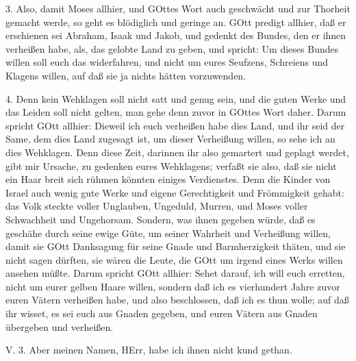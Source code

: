 3. Also, damit Moses allhier, und GOttes Wort auch geschwächt und zur Thorheit gemacht werde, so geht es blödiglich und geringe an. GOtt predigt allhier, daß er erschienen sei Abraham, Isaak und Jakob, und gedenkt des Bundes, den er ihnen verheißen habe, als, das gelobte Land zu geben, und spricht: Um dieses Bundes willen soll euch das widerfahren, und nicht um eures Seufzens, Schreiens und Klagens willen, auf daß sie ja nichts hätten vorzuwenden.

4. Denn kein Wehklagen soll nicht satt und genug sein, und die guten Werke und das Leiden soll nicht gelten, man gehe denn zuvor in GOttes Wort daher. Darum spricht GOtt allhier: Dieweil ich euch verheißen habe dies Land, und ihr seid der Same, dem dies Land zugesagt ist, um dieser Verheißung willen, so sehe ich an dies Wehklagen. Denn diese Zeit, darinnen ihr also gemartert und geplagt werdet, gibt mir Ursache, zu gedenken eures Wehklagens; verfaßt sie also, daß sie nicht ein Haar breit sich rühmen könnten einiges Verdienstes. Denn die Kinder von Israel auch wenig gute Werke und eigene Gerechtigkeit und Frömmigkeit gehabt: das Volk steckte voller Unglauben, Ungeduld, Murren, und Moses voller Schwachheit und Ungehorsam. Sondern, was ihnen gegeben würde, daß es geschähe durch seine ewige Güte, um seiner Wahrheit und Verheißung willen, damit sie GOtt Danksagung für seine Gnade und Barmherzigkeit thäten, und sie nicht sagen dürften, sie wären die Leute, die GOtt um irgend eines Werks willen ansehen müßte. Darum spricht GOtt allhier: Sehet darauf, ich will euch erretten, nicht um eurer gelben Haare willen, sondern daß ich es vierhundert Jahre zuvor euren Vätern verheißen habe, und also beschlossen, daß ich es thun wolle; auf daß ihr wisset, es sei euch aus Gnaden gegeben, und euren Vätern aus Gnaden übergeben und verheißen.

\begin{schriftzitat}
V. 3. Aber meinen Namen, HErr, habe ich ihnen nicht kund gethan.
\end{schriftzitat}


